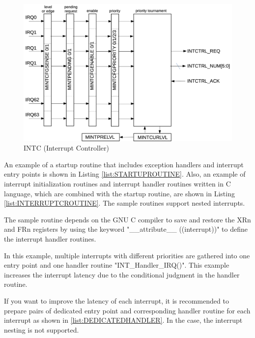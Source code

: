 \begin{figure}[H]
    \includegraphics[width=1.00\columnwidth]{./Figure/Interrupts_INTC.png}
    \caption{INTC (Interrupt Controller)}
    \label{fig:INTERRUPTS_INTC}
\end{figure}

An example of a startup routine that includes exception handlers and interrupt entry points is shown in Listing \ref{list:STARTUPROUTINE}. Also, an example of interrupt initialization routines and interrupt handler routines written in C language, which are combined with the startup routine, are shown in Listing \ref{list:INTERRUPTCROUTINE}. The sample routines support nested interrupts.

The sample routine depends on the GNU C compiler to save and restore the XRn and FRn registers by using the keyword "\_\_attribute\_\_ ((interrupt))" to define the interrupt handler routines. 

In this example, multiple interrupts with different priorities are gathered into one entry point and one handler routine "INT\_Handler\_IRQ()". This example increases the interrupt latency due to the conditional judgment in the handler routine.

If you want to improve the latency of each interrupt, it is recommended to prepare pairs of dedicated entry point and corresponding handler routine for each interrupt as shown in \ref{list:DEDICATEDHANDLER}. In the case, the interrupt nesting is not supported.


